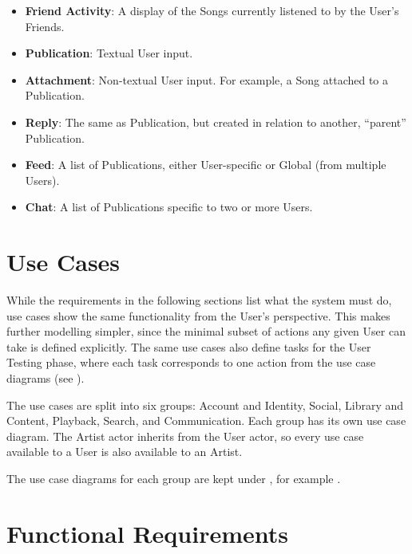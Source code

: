 \begin{itemize}
    \item \textbf{Friend Activity}: A display of the Songs currently listened to by the User's Friends.
    \item \textbf{Publication}: Textual User input.
    \item \textbf{Attachment}: Non-textual User input.
    For example, a Song attached to a Publication.
    \item \textbf{Reply}: The same as Publication, but created in relation to another, ``parent'' Publication.
    \item \textbf{Feed}: A list of Publications, either User-specific or Global (from multiple Users).
    \item \textbf{Chat}: A list of Publications specific to two or more Users.
\end{itemize}
\clearpage


\section{Use Cases}\label{sec:use_cases}
While the requirements in the following sections list what the system must
do, use cases show the same functionality from the User's perspective. This
makes further modelling simpler, since the minimal subset of actions any
given User can take is defined explicitly. The same use cases also define
tasks for the User Testing phase, where each task corresponds
to one action from the use case diagrams (see ).

The use cases are split into six groups: Account and Identity, Social,
Library and Content, Playback, Search, and Communication.
Each group has its own use case diagram.
The Artist actor inherits from the User actor, so every use case available to a User is also available to an Artist.

The use case diagrams for each group are kept under ,
for example .


\section{Functional Requirements}

